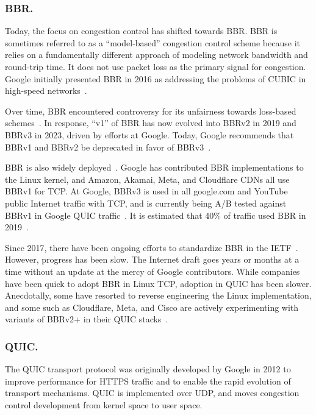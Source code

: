 \subsubsection{BBR.}

Today, the focus on congestion control has shifted towards BBR. BBR is sometimes
referred to as a ``model-based'' congestion control scheme because it relies on
a fundamentally different approach of modeling network bandwidth and round-trip
time. It does not use packet loss as the primary signal for congestion. Google
initially presented BBR in 2016 as addressing the problems of CUBIC in
high-speed networks~\cite{cardwell2016bbr-ietf97}.

Over time, BBR encountered controversy for its unfairness towards loss-based
schemes~\cite{ware2019modeling,philip2021revisiting,cao2019use}. In response,
``v1'' of BBR has now evolved into BBRv2 in 2019 and BBRv3 in 2023, driven by
efforts at Google. Today, Google recommends that BBRv1 and BBRv2 be
deprecated in favor of BBRv3~\cite{cardwell2024bbrv3-ietf119}.

BBR is also widely deployed~\cite
{cardwell2024bbrv3-ietf119-qna,ware2024ccanalyzer}. Google has contributed BBR
implementations to the Linux kernel, and Amazon, Akamai, Meta, and Cloudflare
CDNs all use BBRv1 for TCP. At Google, BBRv3 is used in all google.com and
YouTube public Internet traffic with TCP, and is currently being A/B tested
against BBRv1 in Google QUIC traffic~\cite{cardwell2024bbrv3-ietf119}.
It is estimated that 40\% of traffic used BBR in 2019~\cite{mishra2019great}.

Since 2017, there have been ongoing efforts to standardize BBR in the IETF~\cite{cardwell2024bbr-ietf-draft}.
However, progress has been slow. The Internet draft goes years or months at a
time without an update at the mercy of Google contributors. While companies
have been quick to adopt BBR in Linux TCP, adoption in QUIC has been slower.
Anecdotally, some have resorted to reverse engineering the Linux
implementation, and some such as Cloudflare, Meta, and Cisco are actively
experimenting with variants of BBRv2+ in their QUIC stacks~\cite
{cardwell2024bbrv3-ietf119-qna}.

\subsubsection{QUIC.}

The QUIC transport protocol was originally developed by Google in 2012 to
improve performance for HTTPS traffic and to enable the rapid
evolution of transport mechanisms. QUIC is implemented over UDP, and moves
congestion control development from kernel space to user space.

